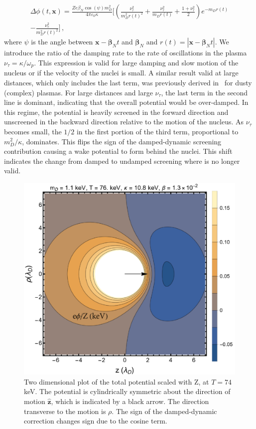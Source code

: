 \begin{multline}\label{eq:pos_point_DDS}
\Delta \phi(t,\boldsymbol{x}) = \frac{Ze \beta_N \cos (\psi) m_D^2}{4 \pi \varepsilon_0 \kappa} \Bigg[\left(\frac{\nu_\tau^2}{m_D^2 r(t)^2} + \frac{\nu_\tau^2}{m_D r(t)}+\frac{1 + \nu_\tau^2}{2}\right)e^{-m_D r(t)} \\ -\frac{\nu_\tau^2}{m_D^2 r(t)^2}\Bigg]\,,
\end{multline}
where $\psi$ is the angle between $\boldsymbol{x}-\boldsymbol{\beta}_N t$ and $\boldsymbol{\beta}_N$ and $r(t) = |\boldsymbol{x}-\boldsymbol{\beta}_N t|$.
We introduce the ratio of the damping rate to the rate of oscillations in the plasma $\nu_\tau = \kappa/\omega_p$.  This expression is valid for large damping and slow motion of the nucleus or if the velocity of the nuclei is small. A similar result valid at large distances, which only includes the last term, was previously derived in~\citep{Stenflo:1973} for dusty (complex) plasmas. For large distances and large $\nu_\tau$, the last term in the second line is dominant, indicating that the overall potential would be over-damped. In this regime, the potential is heavily screened in the forward direction and unscreened in the backward direction relative to the motion of the nucleus. As $\nu_\tau$ becomes small, the $1/2$ in the first portion of the third term, proportional to $m_D^2/\kappa$, dominates. This flips the sign of the damped-dynamic screening contribution causing a wake potential to form behind the nuclei. This shift indicates the change from damped to undamped screening where  is no longer valid. 

\begin{figure}[h!]
 \centering
 \includegraphics[width=.85\linewidth]{plots/chap03BBN/Pot_2DPlotFix.png}
 \caption{Two dimensional plot of the total potential  scaled with Z, at $T=74\,$keV. The potential is cylindrically symmetric about the direction of motion $\boldsymbol{\hat{z}}$, which is indicated by a black arrow. The direction transverse to the motion is $\rho$. The sign of the damped-dynamic correction  changes sign due to the cosine term.}
 \label{fig:numericalComp}
\end{figure} 

